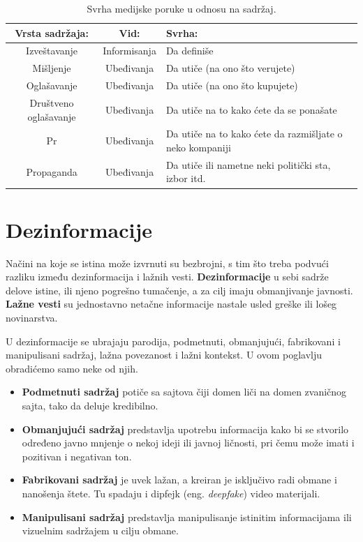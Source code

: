 \documentclass[a4paper]{article}
\begin{document}
\begin{itemize}
\newpage
\begin{table}[h!]
\begin{center}
\begin{tabular}{|c|c|p{3cm} |} \hline
Vrsta sadržaja:& Vid:& Svrha:\\ \hline
Izveštavanje&Informisanja&Da definiše\\ \hline
Mišljenje &Ubeđivanja&Da utiče (na ono što verujete)\\ \hline
Oglašavanje &Ubeđivanja&Da utiče (na ono što kupujete)\\ \hline
Društveno oglašavanje &Ubeđivanja&Da utiče na to kako ćete da se ponašate\\ \hline
Pr &Ubeđivanja&Da utiče na to kako ćete da razmišljate o neko kompaniji\\ \hline
Propaganda &Ubeđivanja&Da utiče ili nametne neki politički sta, izbor itd.\\ \hline
\end{tabular}
\caption{ Svrha medijske poruke u odnosu na sadržaj.}
\label{tab:tabela1}
\end{center}
\end{table}


\section{Dezinformacije}
\label{sec:naslovN}

Načini na koje se istina može izvrnuti su bezbrojni, s tim što treba podvući razliku između dezinformacija i lažnih vesti. \newline \textbf{Dezinformacije} u sebi sadrže delove istine, ili njeno pogrešno tumačenje, a za cilj imaju obmanjivanje javnosti. \newline \textbf{Lažne vesti} su jednostavno netačne informacije nastale usled greške ili lošeg novinarstva.    


U dezinformacije se ubrajaju parodija, podmetnuti, obmanjujući, fabrikovani i manipulisani sadržaj, lažna povezanost i lažni kontekst. U ovom poglavlju obradićemo samo neke od njih.


\begin{itemize}
    \item \textbf{Podmetnuti sadržaj} potiče sa sajtova čiji domen liči na domen zvaničnog sajta, tako da deluje kredibilno.
    \item \textbf{Obmanjujući sadržaj} predstavlja upotrebu informacija kako bi se stvorilo određeno javno mnjenje o nekoj ideji ili javnoj ličnosti, pri čemu može imati i pozitivan i negativan ton.
    \item \textbf{Fabrikovani sadržaj} je uvek lažan, a kreiran je isključivo radi obmane i nanošenja štete. Tu spadaju i dipfejk \cite{deepfake} (eng. \emph{deepfake}) video materijali.
    \item \textbf{Manipulisani sadržaj} predstavlja manipulisanje istinitim informacijama ili vizuelnim sadržajem u cilju obmane.
\end{itemize}



\end{itemize}
\end{document}
